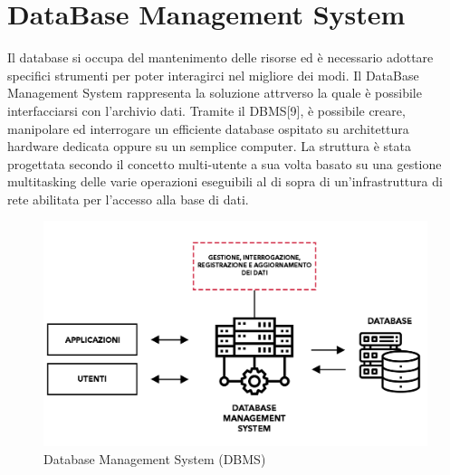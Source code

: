 \section{DataBase Management System}
Il database si occupa del mantenimento delle risorse ed è necessario adottare specifici strumenti per poter interagirci nel migliore dei modi.
Il DataBase Management System rappresenta la soluzione attrverso la quale è possibile interfacciarsi con l'archivio dati. Tramite il DBMS[9], è possibile creare, manipolare ed interrogare un efficiente database ospitato su architettura hardware dedicata oppure su un semplice computer.
La struttura è stata progettata secondo il concetto multi-utente a sua volta basato su una gestione multitasking delle varie operazioni eseguibili al di sopra di un'infrastruttura di rete abilitata per l'accesso alla base di dati.

\begin{figure}[ht!]
    \centering
    \includegraphics[width=140mm]{images/DBMS.png}
    \caption{Database Management System (DBMS)\label{overflow}}
\end{figure}

\clearpage

